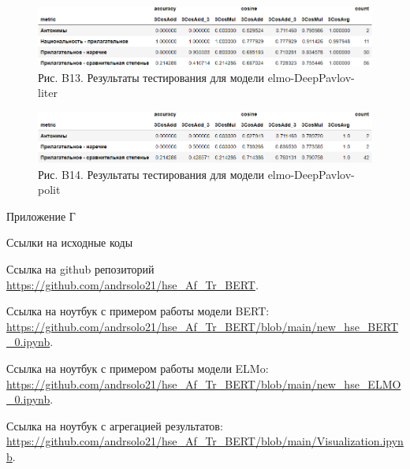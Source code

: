 \documentclass[a4paper,14pt]{article}
\begin{document}
\begin{figure}[H]
	\centering
	\includegraphics[width=0.9\linewidth]{image/res_elmo-DeepPavlov-liter }
	\caption*{Рис. B13. Результаты тестирования для модели elmo-DeepPavlov-liter }
	\label{fig:reselmo-DeepPavlov-liter }
\end{figure}

\begin{figure}[H]
	\centering
	\includegraphics[width=0.9\linewidth]{image/res_elmo-DeepPavlov-polit }
	\caption*{Рис. B14. Результаты тестирования для модели elmo-DeepPavlov-polit }
	\label{fig:reselmo-DeepPavlov-polit }
\end{figure}

\newpage


\begin{flushright}
	Приложение Г
\end{flushright}

\begin{center}
	Ссылки на исходные коды
\end{center}

Ссылка на github репозиторий \href{https://github.com/andrsolo21/hse_Af_Tr_BERT}{https://github.com/andrsolo21/hse\_Af\_Tr\_BERT}.

Ссылка на ноутбук с примером работы модели BERT: \href{https://github.com/andrsolo21/hse_Af_Tr_BERT/blob/main/new_hse_BERT_0.ipynb}{https://github.com/andrsolo21/hse\_Af\_Tr\_BERT/blob/main/new\_hse\_BERT\_0.ipynb}.

Ссылка на ноутбук с примером работы модели ELMo:  \href{https://github.com/andrsolo21/hse_Af_Tr_BERT/blob/main/new_hse_ELMO_0.ipynb}{https://github.com/andrsolo21/hse\_Af\_Tr\_BERT/blob/main/new\_hse\_ELMO\_0.ipynb}.

Ссылка на ноутбук с агрегацией результатов: \href{https://github.com/andrsolo21/hse_Af_Tr_BERT/blob/main/Visualization.ipynb}{https://github.com/andrsolo21/hse\_Af\_Tr\_BERT/blob/main/Visualization.ipynb}.
\end{document}

